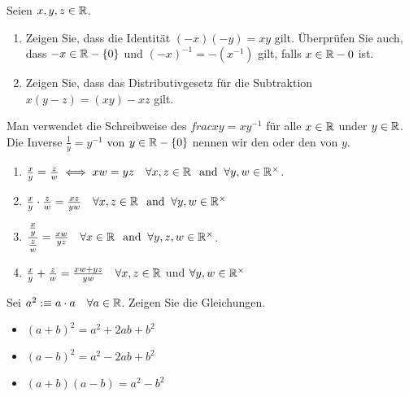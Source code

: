 \begin{imp-ex}
  Seien $x,y,z \in \mathbb{R}$.
  \begin{enumerate}
    \item Zeigen Sie, dass die Identität $(-x)(-y)=xy$ gilt. Überprüfen Sie auch, dass $-x \in \mathbb{R} - \{0\}$ und $(-x)^{-1} = -(x^{-1})$ gilt, falls $x \in \mathbb{R}-{0}$ ist.
    \item Zeigen Sie, dass das Distributivgesetz für die Subtraktion $x(y-z) = (xy)-xz$ gilt.
  \end{enumerate}
\end{imp-ex}

Man verwendet die Schreibweise des  $frac{x}{y}=xy^{-1}$ für alle  $x \in \mathbb{R}$ under  $y \in \mathbb{R}$. Die Inverse $\frac{1}{y}=y^{-1}$ von $y \in \mathbb{R}-\{0\}$ nennen wir den  oder den  von $y$.

\begin{imp-ex} 
  \phantom{.}
  \begin{enumerate}
    \item $\tfrac{x}{y}=\tfrac{z}{w} \iff xw = yz \quad \forall x,z \in \mathbb{R} \;\;\, \text{and}\;\; \forall y,w \in \mathbb{R}^{\times}$.
    \item $\tfrac{x}{y} \cdot \tfrac{z}{w} = \tfrac{xz}{yw} \quad \forall x,z \in \mathbb{R} \;\;\, \text{and}\;\; \forall y,w \in \mathbb{R}^{\times}$
    \item $\dfrac{\tfrac{x}{y}}{\tfrac{z}{w}} = \tfrac{xw}{yz} \quad \forall x \in \mathbb{R} \;\;\, \text{and}\;\; \forall y,z,w \in \mathbb{R}^{\times}$.
    \item $\tfrac{x}{y} + \tfrac{z}{w} = \tfrac{xw + yz}{yw} \quad \forall x,z \in \mathbb{R}$ und $\forall y,w \in \mathbb{R}^{\times}$
  \end{enumerate}
\end{imp-ex}

\begin{imp-ex}
  Sei $a^2 :\equiv a \cdot a \quad \forall a \in \mathbb{R}$. Zeigen Sie die Gleichungen.
  \begin{itemize}
    \item $(a+b)^2 = a^2 + 2ab + b^2$
    \item $(a-b)^2 = a^2 -2ab + b^2$
    \item $(a+b)(a-b)=a^2-b^2$
  \end{itemize}

\end{imp-ex}

